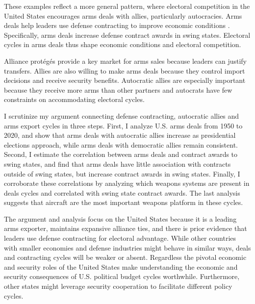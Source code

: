 \documentclass[12pt]{article}
\begin{document}
These examples reflect a more general pattern, where electoral competition in the United States encourages arms deals with allies, particularly autocracies.
Arms deals help leaders use defense contracting to improve economic conditions \citep{Tufte1978, Mintz1988, Mayer1995, DerouenHeo2000, Becker2021}. 
Specifically, arms deals increase defense contract awards in swing states. 
Electoral cycles in arms deals thus shape economic conditions and electoral competition. 


Alliance prot{\'e}g{\'e}s provide a key market for arms sales because leaders can justify transfers. 
Allies are also willing to make arms deals because they control import decisions and receive security benefits. 
Autocratic allies are especially important because they receive more arms than other partners \citep{McManusYarhi-Milo2017} and autocrats have few constraints on accommodating electoral cycles.


I scrutinize my argument connecting defense contracting, autocratic allies and arms export cycles in three steps. 
First, I analyze U.S. arms deals from 1950 to 2020, and show that arms deals with autocratic allies increase as presidential elections approach, while arms deals with democratic allies remain consistent. 
Second, I estimate the correlation between arms deals and contract awards to swing states, and find that arms deals have little association with contracts outside of swing states, but increase contract awards in swing states. 
Finally, I corroborate these correlations by analyzing which weapons systems are present in deals cycles and correlated with swing state contract awards.
The last analysis suggests that aircraft are the most important weapons platform in these cycles. 


The argument and analysis focus on the United States because it is a leading arms exporter, maintains expansive alliance ties, and there is prior evidence that leaders use defense contracting for electoral advantage. 
While other countries with smaller economies and defense industries might behave in similar ways, deals and contracting cycles will be weaker or absent.
Regardless the pivotal economic and security roles of the United States make understanding the economic and security consequences of U.S. political budget cycles worthwhile.
Furthermore, other states might leverage security cooperation to facilitate different policy cycles. 
\end{document}
